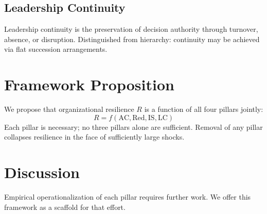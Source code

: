 \documentclass[11pt]{article}
\begin{document}
\subsection{Leadership Continuity}
Leadership continuity is the preservation of decision authority through turnover, absence, or disruption. Distinguished from hierarchy: continuity may be achieved via flat succession arrangements.

\section{Framework Proposition}
We propose that organizational resilience $R$ is a function of all four pillars jointly:
\[
R = f(\text{AC}, \text{Red}, \text{IS}, \text{LC})
\]
Each pillar is necessary; no three pillars alone are sufficient. Removal of any pillar collapses resilience in the face of sufficiently large shocks.

\section{Discussion}
Empirical operationalization of each pillar requires further work. We offer this framework as a scaffold for that effort.
\end{document}
